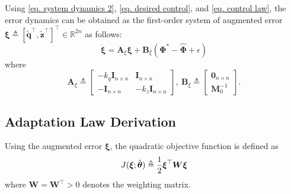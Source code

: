 \documentclass[letterpaper, 10 pt, conference]{ieeeconf}  %
\newcommand\R{\mathbb{R}}
\newcommand*{\mv}[1]{\boldsymbol{#1}}
\newcommand*{\mm}[1]{\boldsymbol{#1}}
\begin{document}
Using \eqref{eq. system dynamics 2}, \eqref{eq. desired control}, and \eqref{eq. control law}, the error dynamics can be obtained as the first-order system of augmented error $\mv \xi\triangleq[\tilde {\mv q}^\top ,\tilde {\mv z}^\top ]^\top \in\R^{2n}$ as follows:
\begin{equation}
    \dot{\mv \xi} 
    = 
    \mm A_\xi{\mv \xi}+\mm B_\xi(\mv \Phi^*-\hat{\mv \Phi}+\epsilon)
\end{equation}
where 
\begin{equation}
    \mm A_\xi \triangleq 
    \begin{bmatrix}
        -{k_q} \mm I_{n\times n} &\mm I_{n\times n}
        \\
        -\mm I_{n\times n}& -{k_z} \mm I_{n\times n}
    \end{bmatrix}
    ,\ 
    \mm B_\xi \triangleq 
    \begin{bmatrix}
        \mm 0_{n\times n}\\\mm M_0^{-1}
    \end{bmatrix}.
\end{equation}

\subsection{Adaptation Law Derivation}\label{sec:adap_laws}

Using the augmented error $\mv \xi$, the quadratic objective function is defined as
\begin{equation}
    J(\mv \xi;\hat{\mv \theta})\triangleq
    {1\over 2}
    \mv \xi^\top \mm W\mv \xi
\end{equation}
where $\mm W=\mm W^\top >0$ denotes the weighting matrix.
\end{document}
